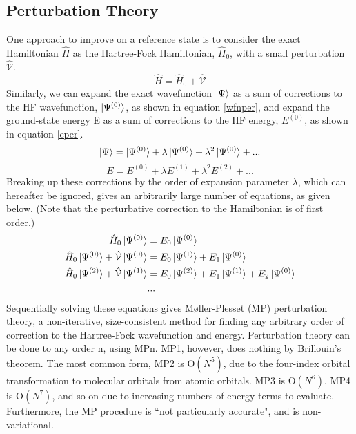 \documentclass{article}
\begin{document}
\subsection{Perturbation Theory}
\begin{paragraph}{}
One approach to improve on a reference state is to consider the exact Hamiltonian $\hat{H}$ as the Hartree-Fock Hamiltonian, $\hat{H}_0$, with a small perturbation $\hat{\mathcal{V}}$. \cite{szabo}
\begin{equation} \label{perturb}
\hat{H}=\hat{H}_0+\hat{\mathcal{V}}
\end{equation}
Similarly, we can expand the exact wavefunction $\ket{\Psi}$ as a sum of corrections to the HF wavefunction, $\ket{\Psi^{\left(0\right)}}$, as shown in equation \ref{wfnper}, and expand the ground-state energy E as a sum of corrections to the HF energy, $E^{\left(0\right)}$, as shown in equation \ref{eper}. \cite{szabo}\cite{atkins}
\begin{equation} \label{wfnper}
\ket{\Psi}=\ket{\Psi^{\left(0\right)}}+\lambda\ket{\Psi^{\left(0\right)}}+\lambda^2\ket{\Psi^{\left(0\right)}}+...
\end{equation}
\begin{equation}\label{eper}
E = E^{\left(0\right)}+\lambda E^{\left(1\right)}+\lambda^2 E^{\left(2\right)}+...
\end{equation}
Breaking up these corrections by the order of expansion parameter $\lambda$, which can hereafter be ignored, gives an arbitrarily large number of equations, as given below. \cite{atkins}  (Note that the perturbative correction to the Hamiltonian is of first order.)
\begin{align*}
\hat{H}_0\ket{\Psi^{\left(0\right)}}&=E_0\ket{\Psi^{\left(0\right)}}\\
\hat{H}_0\ket{\Psi^{\left(0\right)}}+\hat{\mathcal{V}}\ket{\Psi^{\left(0\right)}}&=E_0\ket{\Psi^{\left(1\right)}}+E_1\ket{\Psi^{\left(0\right)}}\\
\hat{H}_0\ket{\Psi^{\left(2\right)}}+\hat{\mathcal{V}}\ket{\Psi^{\left(1\right)}}&=E_0\ket{\Psi^{\left(2\right)}}+E_1\ket{\Psi^{\left(1\right)}}+E_2\ket{\Psi^{\left(0\right)}}\\
&...
\end{align*}
Sequentially solving these equations gives M{\o}ller-Plesset (MP) perturbation theory, a non-iterative, size-consistent method for finding any arbitrary order of correction to the Hartree-Fock wavefunction and energy. \cite{atkins}  Perturbation theory can be done to any order n, using MPn.  MP1, however, does nothing by Brillouin's theorem. \cite{jensen}  The most common form, MP2 is O$\left(N^5\right)$, due to the four-index orbital transformation to molecular orbitals from atomic orbitals. \cite{jensen} MP3 is O$\left(N^6\right)$, MP4 is O$\left(N^7\right)$, and so on due to increasing numbers of energy terms to evaluate. \cite{jensen}\cite{diner}\cite{pulay} Furthermore, the MP procedure is ``not particularly accurate", and is non-variational. \cite{pulay}\cite{pulay2}
\end{paragraph}
\end{document}
